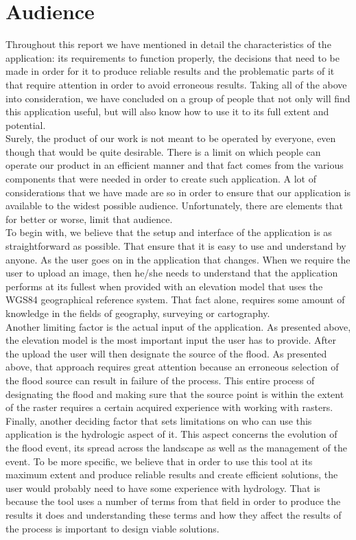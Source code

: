 \section{Audience}
Throughout this report we have mentioned in detail the characteristics of the application: its requirements to function properly, the decisions that need to be made in order for it to produce reliable results and the problematic parts of it that require attention in order to avoid erroneous results. Taking all of the above into consideration, we have concluded on a group of people that not only will find this application useful, but will also know how to use it to its full extent and potential.\\
Surely, the product of our work is not meant to be operated by everyone, even though that would be quite desirable. There is a limit on which people can operate our product in an efficient manner and that fact comes from the various components that were needed in order to create such application. A lot of considerations that we have made are so in order to ensure that our application is available to the widest possible audience. Unfortunately, there are elements that for better or worse, limit that audience.\\

To begin with, we believe that the setup and interface of the application is as straightforward as possible. That ensure that it is easy to use and understand by anyone. As the user goes on in the application that changes. When we require the user to upload an image, then he/she needs to understand that the application performs at its fullest when provided with an elevation model that uses the WGS84 geographical reference system. That fact alone, requires some amount of knowledge in the fields of geography, surveying or cartography.\\

Another limiting factor is the actual input of the application. As presented above, the elevation model is the most important input the user has to provide. After the upload the user will then designate the source of the flood. As presented above, that approach requires great attention because an erroneous selection of the flood source can result in failure of the process. This entire process of designating the flood and making sure that the source point is within the extent of the raster requires a certain acquired experience with working with rasters. \\
Finally, another deciding factor that sets limitations on who can use this application is the hydrologic aspect of it. This aspect concerns the evolution of the flood event, its spread across the landscape as well as the management of the event. To be more specific, we believe that in order to use this tool at its maximum extent and produce reliable results and create efficient solutions, the user would probably need to have some experience with hydrology. That is because the tool uses a number of terms from that field in order to produce the results it does and understanding these terms and how they affect the results of the process is important to design viable solutions.
